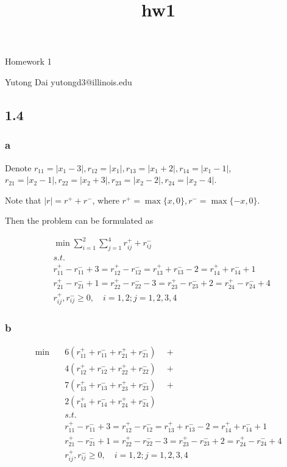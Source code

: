 \documentclass[11pt]{article}
\title{hw1}
\begin{document}
    
    
    \maketitle
    
    

    
    Homework 1

Yutong Dai yutongd3@illinois.edu

    \hypertarget{section}{%
\subsection{1.4}\label{section}}

\hypertarget{a}{%
\subsubsection{a}\label{a}}

Denote \(r_{11}=|x_1-3|, r_{12}=|x_1|, r_{13}=|x_1+2|, r_{14}=|x_1-1|\),
\(r_{21}=|x_2-1|, r_{22}=|x_2+3|, r_{23}=|x_2-2|, r_{24}=|x_2-4|\).

Note that \(|r|=r^+ + r^-\), where
\(r^+ =\max\{x, 0\}, r^-=\max\{-x, 0\}\).

Then the problem can be formulated as

\[
\begin{align*}
    & \min \sum_{i=1}^2\sum_{j=1}^4 r_{ij}^{+} + r^{-}_{ij} \\
    & s.t. \\
    & r_{11}^{+} - r^{-}_{11} + 3 = r_{12}^{+} - r^{-}_{12} = r_{13}^{+} + r^{-}_{13} - 2 = r_{14}^{+} + r^{-}_{14} + 1\\
    & r_{21}^{+} - r^{-}_{21} + 1 = r_{22}^{+} - r^{-}_{22} - 3 = r_{23}^{+} - r^{-}_{23} + 2  = r_{24}^{+} - r^{-}_{24} + 4\\
    & r_{ij}^{+}, r^{-}_{ij}\geq 0, \quad i=1,2; j=1,2,3,4
 \end{align*}
\]

\hypertarget{b}{%
\subsubsection{b}\label{b}}

\[
\begin{align*}
     \min\quad  & 6(r_{11}^{+} + r^{-}_{11} + r_{21}^{+} + r^{-}_{21}) \quad +  \\
            & 4(r_{12}^{+} + r^{-}_{12} + r_{22}^{+} + r^{-}_{22}) \quad + \\
            & 7(r_{13}^{+} + r^{-}_{13} + r_{23}^{+} + r^{-}_{23}) \quad + \\
            & 2(r_{14}^{+} + r^{-}_{14} + r_{24}^{+} + r^{-}_{24})\\
    & s.t. \\
    & r_{11}^{+} - r^{-}_{11} + 3 = r_{12}^{+} - r^{-}_{12} = r_{13}^{+} + r^{-}_{13} - 2 = r_{14}^{+} + r^{-}_{14} + 1\\
    & r_{21}^{+} - r^{-}_{21} + 1 = r_{22}^{+} - r^{-}_{22} - 3 = r_{23}^{+} - r^{-}_{23} + 2  = r_{24}^{+} - r^{-}_{24} + 4\\
    & r_{ij}^{+}, r^{-}_{ij}\geq 0, \quad i=1,2; j=1,2,3,4
 \end{align*}
\]
\end{document}
